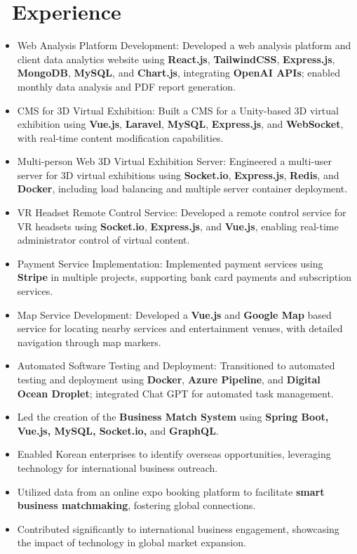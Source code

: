\documentclass{resume}
\begin{document}
\section{\faUsers\ Experience}
\begin{itemize}[noitemsep]
  \item Web Analysis Platform Development: Developed a web analysis platform and client data analytics website using \textbf{React.js}, \textbf{TailwindCSS}, \textbf{Express.js}, \textbf{MongoDB}, \textbf{MySQL}, and \textbf{Chart.js}, integrating \textbf{OpenAI APIs}; enabled monthly data analysis and PDF report generation.
  \item CMS for 3D Virtual Exhibition: Built a CMS for a Unity-based 3D virtual exhibition using \textbf{Vue.js}, \textbf{Laravel}, \textbf{MySQL}, \textbf{Express.js}, and \textbf{WebSocket}, with real-time content modification capabilities.
  \item Multi-person Web 3D Virtual Exhibition Server: Engineered a multi-user server for 3D virtual exhibitions using \textbf{Socket.io}, \textbf{Express.js}, \textbf{Redis}, and \textbf{Docker}, including load balancing and multiple server container deployment.
  \item VR Headset Remote Control Service: Developed a remote control service for VR headsets using \textbf{Socket.io}, \textbf{Express.js}, and \textbf{Vue.js}, enabling real-time administrator control of virtual content.
  \item Payment Service Implementation: Implemented payment services using \textbf{Stripe} in multiple projects, supporting bank card payments and subscription services.
  \item Map Service Development: Developed a \textbf{Vue.js} and \textbf{Google Map} based service for locating nearby services and entertainment venues, with detailed navigation through map markers.
  \item Automated Software Testing and Deployment: Transitioned to automated testing and deployment using \textbf{Docker}, \textbf{Azure Pipeline}, and \textbf{Digital Ocean Droplet}; integrated Chat GPT for automated task management.
\end{itemize}

\begin{itemize}
  \item Led the creation of the \textbf{Business Match System} using \textbf{Spring Boot, Vue.js, MySQL, Socket.io,} and \textbf{GraphQL}.
  \item Enabled Korean enterprises to identify overseas opportunities, leveraging technology for international business outreach.
  \item Utilized data from an online expo booking platform to facilitate \textbf{smart business matchmaking}, fostering global connections.
  \item Contributed significantly to international business engagement, showcasing the impact of technology in global market expansion.
\end{itemize}
\end{document}
